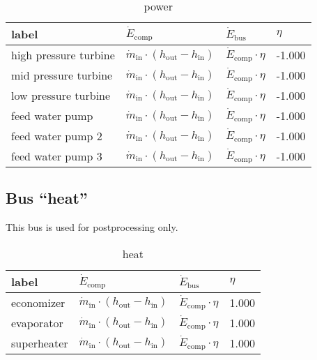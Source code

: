 \begin{table}[H]\begin{center}
\begin{tabular}{llll}
\toprule
                 label &                                                   $\dot{E}_\mathrm{comp}$ &              $\dot{E}_\mathrm{bus}$ &  $\eta$ \\
\midrule
 high pressure turbine &  $\dot{m}_\mathrm{in} \cdot \left(h_\mathrm{out} - h_\mathrm{in} \right)$ &  $\dot{E}_\mathrm{comp} \cdot \eta$ &  -1.000 \\
  mid pressure turbine &  $\dot{m}_\mathrm{in} \cdot \left(h_\mathrm{out} - h_\mathrm{in} \right)$ &  $\dot{E}_\mathrm{comp} \cdot \eta$ &  -1.000 \\
  low pressure turbine &  $\dot{m}_\mathrm{in} \cdot \left(h_\mathrm{out} - h_\mathrm{in} \right)$ &  $\dot{E}_\mathrm{comp} \cdot \eta$ &  -1.000 \\
       feed water pump &  $\dot{m}_\mathrm{in} \cdot \left(h_\mathrm{out} - h_\mathrm{in} \right)$ &  $\dot{E}_\mathrm{comp} \cdot \eta$ &  -1.000 \\
     feed water pump 2 &  $\dot{m}_\mathrm{in} \cdot \left(h_\mathrm{out} - h_\mathrm{in} \right)$ &  $\dot{E}_\mathrm{comp} \cdot \eta$ &  -1.000 \\
     feed water pump 3 &  $\dot{m}_\mathrm{in} \cdot \left(h_\mathrm{out} - h_\mathrm{in} \right)$ &  $\dot{E}_\mathrm{comp} \cdot \eta$ &  -1.000 \\
\bottomrule
\end{tabular}
\caption{power}
\end{center}\end{table}




\subsection{Bus ``heat''}

This bus is used for postprocessing only.

\begin{table}[H]\begin{center}
\begin{tabular}{llll}
\toprule
       label &                                                   $\dot{E}_\mathrm{comp}$ &              $\dot{E}_\mathrm{bus}$ & $\eta$ \\
\midrule
  economizer &  $\dot{m}_\mathrm{in} \cdot \left(h_\mathrm{out} - h_\mathrm{in} \right)$ &  $\dot{E}_\mathrm{comp} \cdot \eta$ &  1.000 \\
  evaporator &  $\dot{m}_\mathrm{in} \cdot \left(h_\mathrm{out} - h_\mathrm{in} \right)$ &  $\dot{E}_\mathrm{comp} \cdot \eta$ &  1.000 \\
 superheater &  $\dot{m}_\mathrm{in} \cdot \left(h_\mathrm{out} - h_\mathrm{in} \right)$ &  $\dot{E}_\mathrm{comp} \cdot \eta$ &  1.000 \\
\bottomrule
\end{tabular}
\caption{heat}
\end{center}\end{table}




